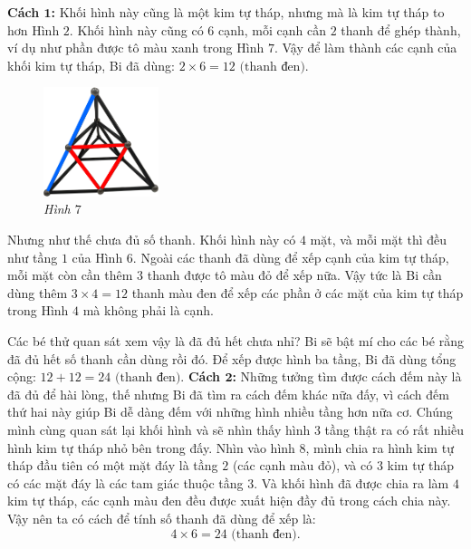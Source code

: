 	\vskip 0.1cm
	\textbf{\color{toancuabi}Cách $\pmb1$:} Khối hình này cũng là một kim tự tháp, nhưng mà là kim tự tháp to hơn Hình $2$. Khối hình này cũng có $6$ cạnh, mỗi cạnh cần $2$  thanh để ghép thành, ví dụ như phần được tô màu xanh trong Hình $7$. Vậy để làm thành các cạnh của khối kim tự tháp, Bi đã dùng:
	$ 2\times 6 = 12 \text{ (thanh đen)}.$
	\begin{multicols}{2}
		\begin{figure}[H]
			\centering
			\vspace*{5pt}
			\captionsetup{labelformat= empty, justification=centering} \includegraphics[width=0.3\textwidth]{7}
			\caption{\small\textit{Hình $7$}}
			\vspace*{-10pt}
		\end{figure}
		Nhưng như thế chưa đủ số thanh. Khối hình này có $4$ mặt, và mỗi mặt thì đều như tầng $1$ của Hình $6$. Ngoài các thanh đã dùng để xếp cạnh của kim tự tháp, mỗi mặt còn cần thêm $3$ thanh được tô màu đỏ để xếp nữa. Vậy tức là Bi cần dùng thêm $3 \times 4 = 12$ thanh màu đen để xếp các phần ở các mặt của kim tự tháp trong Hình $4$ mà không phải là cạnh.
	\end{multicols}
	\vskip 0.1cm
	Các bé thử quan sát xem vậy là đã đủ hết chưa nhỉ? Bi sẽ bật mí cho các bé rằng đã đủ hết số  thanh cần dùng rồi đó. Để xếp được hình ba tầng, Bi đã dùng tổng cộng:
	$ 12 + 12 = 24 \text{ (thanh đen)}.$
	\vskip 0.1cm
	\textbf{\color{toancuabi}Cách $\pmb2$:} Những tưởng tìm được cách đếm này là đã đủ để hài lòng, thế nhưng Bi đã tìm ra cách đếm khác nữa đấy, vì cách đếm thứ hai này giúp Bi dễ dàng đếm với những hình nhiều tầng hơn nữa cơ.
	\vskip 0.1cm
	Chúng mình cùng quan sát lại khối hình và sẽ nhìn thấy hình $3$ tầng thật ra có rất nhiều hình kim tự tháp nhỏ bên trong đấy. Nhìn vào hình $8$, mình chia ra hình kim tự tháp đầu tiên có một mặt đáy là tầng $2$ (các cạnh màu đỏ), và có $3$ kim tự tháp có các mặt đáy là các tam giác thuộc tầng $3$. Và khối hình đã được chia ra làm $4$ kim tự tháp, các cạnh màu đen đều được xuất hiện đầy đủ trong cách chia này. Vậy nên ta có cách để tính số thanh đã dùng để xếp là: 
	$$4 \times 6 = 24 \text{ (thanh đen)}.$$	
